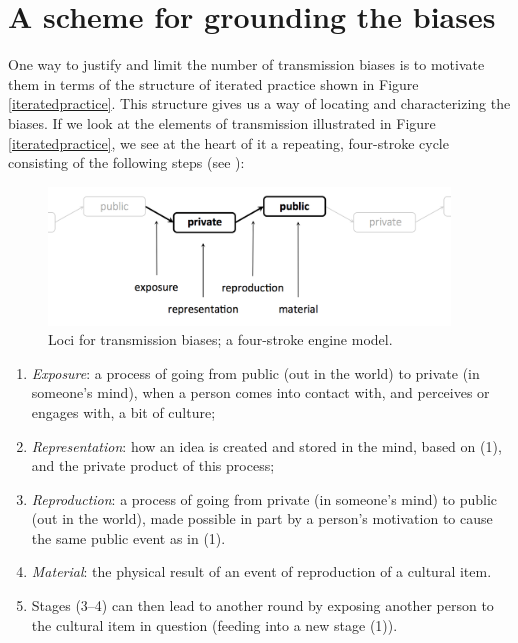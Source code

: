 \section{A scheme for grounding the biases}


One way to justify and limit the number of transmission 
biases is to motivate them in terms of the structure of iterated practice shown in Figure \ref{iteratedpractice}. This structure gives us a way of locating and characterizing the biases. 
If we look at the elements of transmission illustrated in Figure \ref{iteratedpractice}, we see 
at the heart of it a repeating, four-stroke cycle consisting of the following steps (see ): 



\begin{figure}[h]
\includegraphics[width=0.95\textwidth,keepaspectratio]{figures/ch02fig02}
\caption{Loci for transmission biases; a four-stroke engine model.}
\label{fourstroke}
\end{figure}


\begin{enumerate}
 
\item \textit{Exposure}: a process of going from public (out in the world) to private (in someone's mind), 
when a person comes into contact with, and 
perceives or engages with, a bit of culture;



\item \textit{Representation}: how an idea is created and stored in the mind, based on (1), and the private product of this process;



\item \textit{Reproduction}: a process of going from private (in someone's mind) to public (out in the world), 
made possible in part by a person's motivation to cause the same 
public event as in (1). 



\item \textit{Material}: the physical result of an 
event of reproduction of a cultural item.



\item Stages (3--4) can then lead to another round by exposing another 
person to the cultural item in question (feeding into a new stage (1)). 

\end{enumerate}








